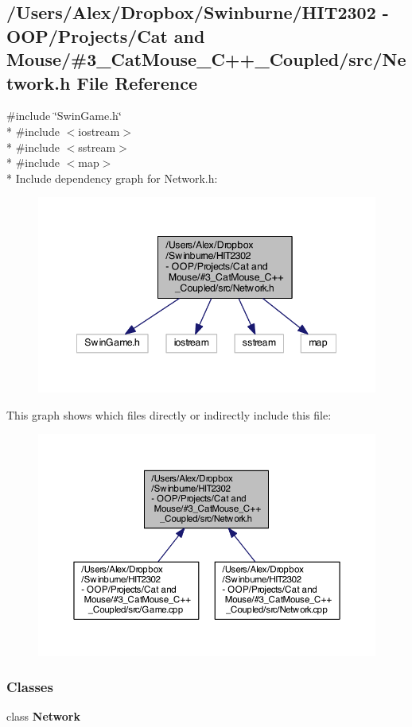 \subsection{/\-Users/\-Alex/\-Dropbox/\-Swinburne/\-H\-I\-T2302 -\/ O\-O\-P/\-Projects/\-Cat and Mouse/\#3\-\_\-\-Cat\-Mouse\-\_\-\-C++\-\_\-\-Coupled/src/\-Network.h File Reference}
\label{_network_8h}
{\ttfamily \#include \char`\"{}Swin\-Game.\-h\char`\"{}}\\*
{\ttfamily \#include $<$iostream$>$}\\*
{\ttfamily \#include $<$sstream$>$}\\*
{\ttfamily \#include $<$map$>$}\\*
Include dependency graph for Network.\-h\-:
\nopagebreak
\begin{figure}[H]
\begin{center}
\leavevmode
\includegraphics[width=345pt]{_network_8h__incl}
\end{center}
\end{figure}
This graph shows which files directly or indirectly include this file\-:
\nopagebreak
\begin{figure}[H]
\begin{center}
\leavevmode
\includegraphics[width=350pt]{_network_8h__dep__incl}
\end{center}
\end{figure}
\subsubsection*{Classes}
\begin{DoxyCompactItemize}
\item 
class {\bf Network}
\end{DoxyCompactItemize}
